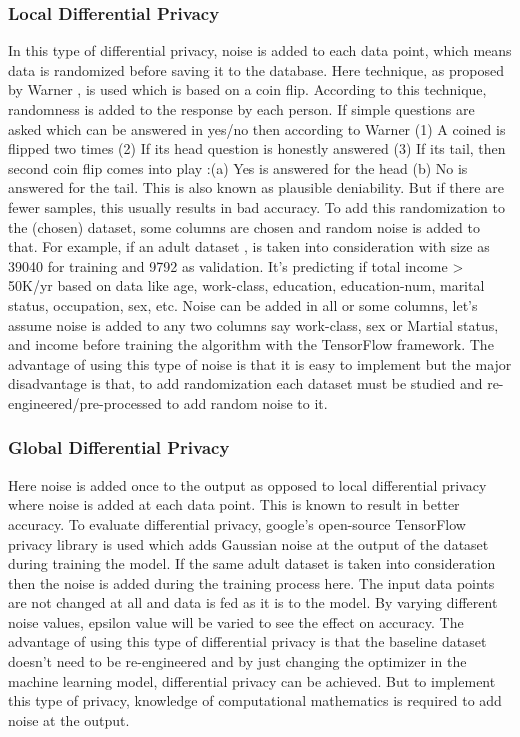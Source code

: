 \subsubsection{Local Differential Privacy}
In this type of differential privacy, noise is added to each data point, which means data is randomized before saving it to the database. Here technique, as proposed by Warner \cite{14}, is used which is based on a coin flip. According to this technique, randomness is added to the response by each person. If simple questions are asked which can be answered in yes/no then according to Warner (1) A coined is flipped two times (2) If its head question is honestly answered (3) If its tail, then second coin flip comes into play :(a) Yes is answered for the head (b) No is answered for the tail. This is also known as plausible deniability. But if there are fewer samples, this usually results in bad accuracy. To add this randomization to the (chosen) dataset, some columns are chosen and random noise is added to that. For example, if an adult dataset \cite{15}, is taken into consideration with size as 39040 for training and 9792 as validation. It's predicting if total income > 50K/yr based on data like age, work-class, education, education-num, marital status, occupation, sex, etc. Noise can be added in all or some columns, let's assume noise is added to any two columns say work-class, sex or Martial status, and income before training the algorithm with the TensorFlow framework. The advantage of using this type of noise is that it is easy to implement but the major disadvantage is that, to add randomization each dataset must be studied and re-engineered/pre-processed to add random noise to it.

\subsubsection{Global Differential Privacy}
Here noise is added once to the output as opposed to local differential privacy where noise is added at each data point. This is known to result in better accuracy. To evaluate differential privacy, google's open-source TensorFlow privacy library \cite{11} is used which adds Gaussian noise at the output of the dataset during training the model. If the same adult dataset is taken into consideration then the noise is added during the training process here. The input data points are not changed at all and data is fed as it is to the model. By varying different noise values, epsilon value will be varied to see the effect on accuracy. The advantage of using this type of differential privacy is that the baseline dataset doesn’t need to be re-engineered and by just changing the optimizer in the machine learning model, differential privacy can be achieved. But to implement this type of privacy, knowledge of computational mathematics is required to add noise at the output.

